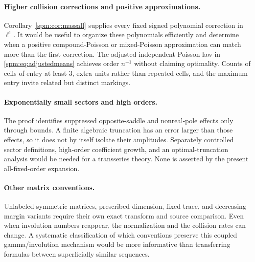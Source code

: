 \paragraph{Higher collision corrections and positive approximations.}
Corollary~\ref{spm:cor:massall} supplies every fixed signed polynomial correction in $\ell^1$. It would be useful to organize these polynomials efficiently and determine when a positive compound-Poisson or mixed-Poisson approximation can match more than the first correction. The adjusted independent Poisson law in \eqref{spm:eq:adjustedmeans} achieves order $n^{-1}$ without claiming optimality. Counts of cells of entry at least $3$, extra units rather than repeated cells, and the maximum entry invite related but distinct markings.

\paragraph{Exponentially small sectors and high orders.}
The proof identifies suppressed opposite-saddle and nonreal-pole effects only through bounds. A finite algebraic truncation has an error larger than those effects, so it does not by itself isolate their amplitudes. Separately controlled sector definitions, high-order coefficient growth, and an optimal-truncation analysis would be needed for a transseries theory. None is asserted by the present all-fixed-order expansion.

\paragraph{Other matrix conventions.}
Unlabeled symmetric matrices, prescribed dimension, fixed trace, and decreasing-margin variants require their own exact transform and source comparison. Even when involution numbers reappear, the normalization and the collision rates can change. A systematic classification of which conventions preserve this coupled gamma/involution mechanism would be more informative than transferring formulas between superficially similar sequences.

